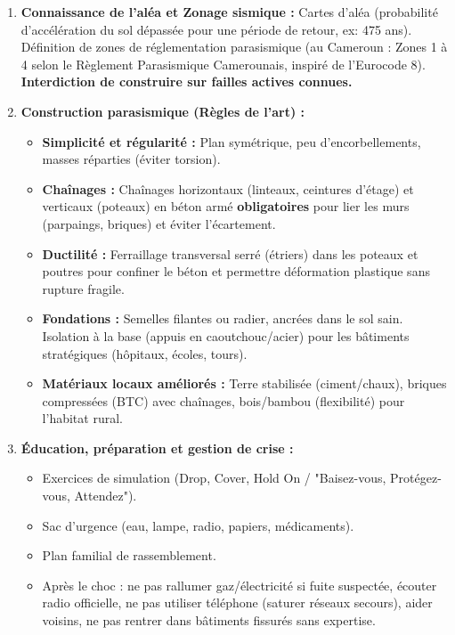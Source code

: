 \documentclass[11pt]{article}
\begin{document}
\begin{enumerate}
    \item \textbf{Connaissance de l'aléa et Zonage sismique :} Cartes d'aléa (probabilité d'accélération du sol dépassée pour une période de retour, ex: 475 ans). Définition de zones de réglementation parasismique (au Cameroun : Zones 1 à 4 selon le Règlement Parasismique Camerounais, inspiré de l'Eurocode 8). \textbf{Interdiction de construire sur failles actives connues.}
    \item \textbf{Construction parasismique (Règles de l'art) :}
    \begin{itemize}
        \item \textbf{Simplicité et régularité :} Plan symétrique, peu d'encorbellements, masses réparties (éviter torsion).
        \item \textbf{Chaînages :} Chaînages horizontaux (linteaux, ceintures d'étage) et verticaux (poteaux) en béton armé \textbf{obligatoires} pour lier les murs (parpaings, briques) et éviter l'écartement.
        \item \textbf{Ductilité :} Ferraillage transversal serré (étriers) dans les poteaux et poutres pour confiner le béton et permettre déformation plastique sans rupture fragile.
        \item \textbf{Fondations :} Semelles filantes ou radier, ancrées dans le sol sain. Isolation à la base (appuis en caoutchouc/acier) pour les bâtiments stratégiques (hôpitaux, écoles, tours).
        \item \textbf{Matériaux locaux améliorés :} Terre stabilisée (ciment/chaux), briques compressées (BTC) avec chaînages, bois/bambou (flexibilité) pour l'habitat rural.
    \end{itemize}
    \item \textbf{Éducation, préparation et gestion de crise :}
    \begin{itemize}
        \item Exercices de simulation (Drop, Cover, Hold On / "Baisez-vous, Protégez-vous, Attendez").
        \item Sac d'urgence (eau, lampe, radio, papiers, médicaments).
        \item Plan familial de rassemblement.
        \item Après le choc : ne pas rallumer gaz/électricité si fuite suspectée, écouter radio officielle, ne pas utiliser téléphone (saturer réseaux secours), aider voisins, ne pas rentrer dans bâtiments fissurés sans expertise.
    \end{itemize}
\end{enumerate}
\end{document}
